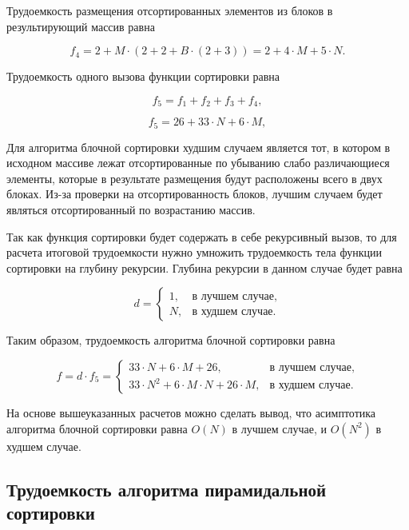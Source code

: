 Трудоемкость размещения отсортированных элементов из блоков в результирующий массив равна

\begin{equation}
	f_4 = 2 + M \cdot (2 + 2 + B \cdot (2 + 3)) = 2 + 4 \cdot M + 5 \cdot N.
\end{equation}

Трудоемкость одного вызова функции сортировки равна

\begin{equation}
	f_5 = f_1 + f_2 + f_3 + f_4,
\end{equation}

\begin{equation}
	f_5 = 26 + 33 \cdot N + 6 \cdot M,
\end{equation}

Для алгоритма блочной сортировки худшим случаем является тот, в котором в исходном массиве лежат отсортированные по убыванию слабо различающиеся элементы, которые в результате размещения будут расположены всего в двух блоках. Из-за проверки на отсортированность блоков, лучшим случаем будет являться отсортированный по возрастанию массив.

Так как функция сортировки будет содержать в себе рекурсивный вызов, то для расчета итоговой трудоемкости нужно умножить трудоемкость тела функции сортировки на глубину рекурсии. Глубина рекурсии в данном случае будет равна

\begin{equation}
	d = \begin{cases}
		1, & \text{в лучшем случае}, \\
		N, & \text{в худшем случае}.
	\end{cases}
\end{equation}

Таким образом, трудоемкость алгоритма блочной сортировки равна

\begin{equation}
	f = d \cdot f_5 = \begin{cases}
		33 \cdot N + 6 \cdot M + 26, & \text{в лучшем случае}, \\
		33 \cdot N^2 + 6 \cdot M \cdot N + 26 \cdot M, & \text{в худшем случае}.
	\end{cases}
\end{equation}

На основе вышеуказанных расчетов можно сделать вывод, что асимптотика алгоритма блочной сортировки равна $O(N)$ в лучшем случае, и $O(N^2)$ в худшем случае.

\subsection{Трудоемкость алгоритма пирамидальной сортировки}

